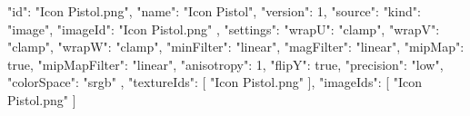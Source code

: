 {
  "id": "Icon Pistol.png",
  "name": "Icon Pistol",
  "version": 1,
  "source": {
    "kind": "image",
    "imageId": "Icon Pistol.png"
  },
  "settings": {
    "wrapU": "clamp",
    "wrapV": "clamp",
    "wrapW": "clamp",
    "minFilter": "linear",
    "magFilter": "linear",
    "mipMap": true,
    "mipMapFilter": "linear",
    "anisotropy": 1,
    "flipY": true,
    "precision": "low",
    "colorSpace": "srgb"
  },
  "textureIds": [
    "Icon Pistol.png"
  ],
  "imageIds": [
    "Icon Pistol.png"
  ]
}
